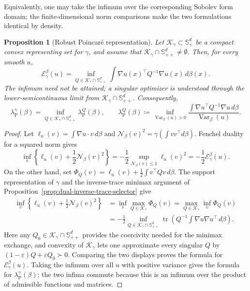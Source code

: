 \documentclass{article}
\newtheorem{proposition}[theorem]{Proposition}
\newcommand{\MN}{\mathcal{N}}
\newcommand{\tr}{\operatorname{tr}}
\newcommand{\cK}{\mathcal K_\gamma}
\newcommand{\Sppd}{\mathbb S_{++}^d}
\begin{document}
Equivalently, one may take the infimum over the corresponding Sobolev form
domain; the finite-dimensional norm comparisons make the two formulations
identical by density.

\begin{proposition}[Robust Poincar\'e representation]
\label{prop:robust-poincare-representation}
Let $\cK\subset\mathbb S_+^d$ be a compact convex representing set for
$\gamma$, and assume that $\cK\cap\Sppd\ne\emptyset$.  Then, for every smooth
$u$,
\[
    \mathcal E_\gamma^\beta(u)
    =
    \inf_{Q\in\cK\cap\Sppd}
    \int \nabla u(x)^\top Q^{-1}\nabla u(x)\,d\beta(x).
\]
The infimum need not be attained; a singular optimizer is understood through
the lower-semicontinuous limit from $\cK\cap\Sppd$.  Consequently,
\[
    \lambda_{\mathrm P}^\gamma(\beta)
    =
    \inf_{Q\in\cK\cap\Sppd}
    \lambda_{\mathrm P}^Q(\beta),
    \qquad
    \lambda_{\mathrm P}^Q(\beta)
    \coloneqq
    \inf_{\operatorname{Var}_\beta(u)>0}
    \frac{\int \nabla u^\top Q^{-1}\nabla u\,d\beta}
         {\operatorname{Var}_\beta(u)} .
\]
\end{proposition}

\begin{proof}
Let $\ell_u(v)=\int\nabla u\cdot v\,d\beta$ and
$\MN_\beta(v)^2=\gamma(\int vv^\top d\beta)$.  Fenchel duality for a squared
norm gives
\[
    \inf_v\left\{\ell_u(v)+\frac12\MN_\beta(v)^2\right\}
    =
    -\frac12
    \sup_{\MN_\beta(v)\le1}\ell_u(v)^2
    =
    -\frac12\mathcal E_\gamma^\beta(u).
\]
On the other hand, set
$\Phi_Q(v)=\ell_u(v)+\frac12\int v^\top Qv\,d\beta$.  The support
representation of $\gamma$ and the inverse-trace minimax argument of
Proposition~\ref{prop:dual-inverse-trace-selector} give
\[
\begin{aligned}
    \inf_v\left\{\ell_u(v)+\frac12\MN_\beta(v)^2\right\}
    &=
    \inf_v\max_{Q\in\cK}\Phi_Q(v)
    =
    \max_{Q\in\cK}\inf_v\Phi_Q(v) \\
    &=
    -\frac12\inf_{Q\in\cK\cap\Sppd}
    \tr\!\left(
        Q^{-1}\int\nabla u\nabla u^\top\,d\beta
    \right).
\end{aligned}
\]
Here any $Q_0\in\cK\cap\Sppd$ provides the coercivity needed for the minimax
exchange, and convexity of $\cK$ lets one approximate every singular $Q$ by
$(1-\varepsilon)Q+\varepsilon Q_0\succ0$.  Comparing the two displays proves
the formula for $\mathcal E_\gamma^\beta(u)$.  Taking the
infimum over all $u$ with positive variance gives the formula for
$\lambda_{\mathrm P}^\gamma(\beta)$; the two infima commute because this is an
infimum over the product of admissible functions and matrices.
\end{proof}
\end{document}
